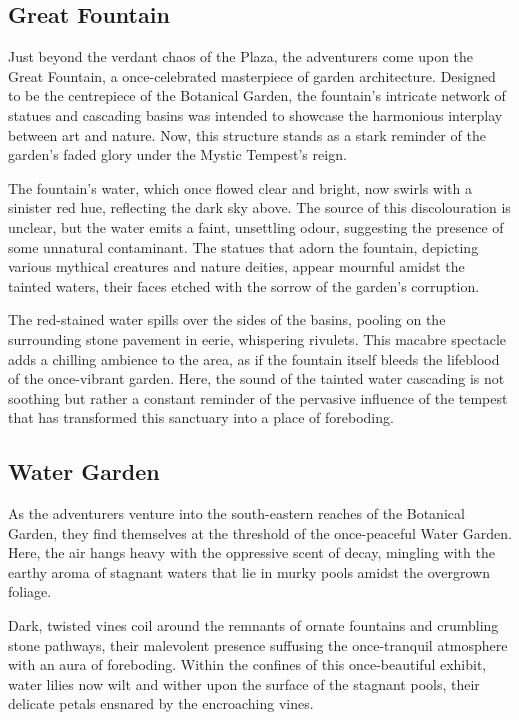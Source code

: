 \subsection*{Great Fountain}
Just beyond the verdant chaos of the Plaza, the adventurers come upon the Great Fountain, a once-celebrated masterpiece of garden architecture. Designed to be the centrepiece of the Botanical Garden, the fountain's intricate network of statues and cascading basins was intended to showcase the harmonious interplay between art and nature. Now, this structure stands as a stark reminder of the garden's faded glory under the Mystic Tempest's reign.

The fountain's water, which once flowed clear and bright, now swirls with a sinister red hue, reflecting the dark sky above. The source of this discolouration is unclear, but the water emits a faint, unsettling odour, suggesting the presence of some unnatural contaminant. The statues that adorn the fountain, depicting various mythical creatures and nature deities, appear mournful amidst the tainted waters, their faces etched with the sorrow of the garden's corruption.

The red-stained water spills over the sides of the basins, pooling on the surrounding stone pavement in eerie, whispering rivulets. This macabre spectacle adds a chilling ambience to the area, as if the fountain itself bleeds the lifeblood of the once-vibrant garden. Here, the sound of the tainted water cascading is not soothing but rather a constant reminder of the pervasive influence of the tempest that has transformed this sanctuary into a place of foreboding.

\subsection*{Water Garden}
As the adventurers venture into the south-eastern reaches of the Botanical Garden, they find themselves at the threshold of the once-peaceful Water Garden. Here, the air hangs heavy with the oppressive scent of decay, mingling with the earthy aroma of stagnant waters that lie in murky pools amidst the overgrown foliage.

Dark, twisted vines coil around the remnants of ornate fountains and crumbling stone pathways, their malevolent presence suffusing the once-tranquil atmosphere with an aura of foreboding. Within the confines of this once-beautiful exhibit, water lilies now wilt and wither upon the surface of the stagnant pools, their delicate petals ensnared by the encroaching vines.

